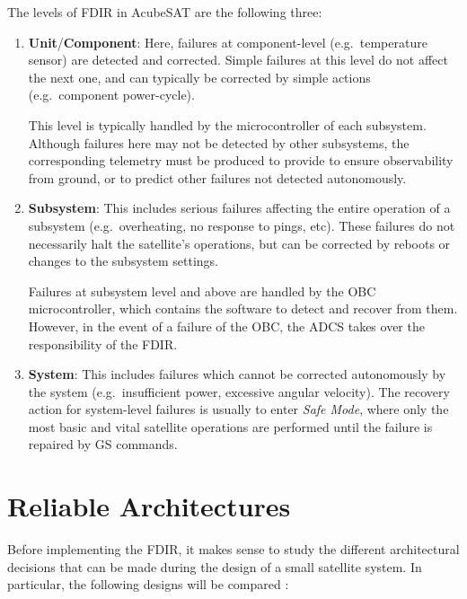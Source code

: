 \documentclass[a4paper,nobib]{tufte-book}
\begin{document}
The levels of \acs{FDIR} in AcubeSAT are the following three:
\begin{enumerate}[label=Level \arabic*]
	\item \textbf{Unit}/\textbf{Component}: Here, failures at component-level (e.g.\ temperature sensor) are detected and corrected. Simple failures at this level do not affect the next one, and can typically be corrected by simple actions (e.g.\ component power-cycle).
	
	This level is typically handled by the microcontroller of each subsystem. Although failures here may not be detected by other subsystems, the corresponding telemetry must be produced to provide to ensure observability from ground, or to predict other failures not detected autonomously.
	\item \textbf{Subsystem}: This includes serious failures affecting the entire operation of a subsystem (e.g.\ overheating, no response to pings, etc). These failures do not necessarily halt the satellite's operations, but can be corrected by reboots or changes to the subsystem settings.
	
	Failures at subsystem level and above are handled by the \acf{OBC} microcontroller, which contains the software to detect and recover from them. However, in the event of a failure of the \acs{OBC}, the \ac{ADCS} takes over the responsibility of the \acs{FDIR}.
	\item \textbf{System}: This includes failures which cannot be corrected au\-to\-nom\-ous\-ly by the system (e.g.\ insufficient power, excessive angular velocity). The recovery action for system-level failures is usually to enter \emph{Safe Mode}, where only the most basic and vital satellite operations are performed until the failure is repaired by \acl{GS} commands.
\end{enumerate}

\section{Reliable Architectures}
\label{sec:theoretical}

Before implementing the \acs{FDIR}, it makes sense to study the different architectural decisions that can be made during the design of a small satellite system. In particular, the following designs will be compared \autocite{birolini_reliability_engineering_2004}:
\end{document}

